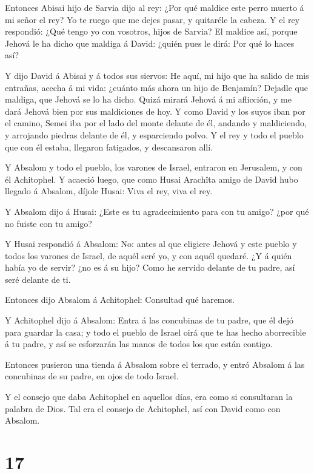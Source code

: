  Entonces Abisai hijo de Sarvia dijo al rey: ¿Por qué
maldice este perro muerto á mi señor el rey? Yo te ruego que me dejes
pasar, y quitaréle la cabeza.  Y el rey respondió: ¿Qué
tengo yo con vosotros, hijos de Sarvia? El maldice así, porque Jehová le
ha dicho que maldiga á David: ¿quién pues le dirá: Por qué lo haces así?

 Y dijo David á Abisai y á todos sus siervos: He aquí, mi
hijo que ha salido de mis entrañas, acecha á mi vida: ¿cuánto más ahora
un hijo de Benjamín? Dejadle que maldiga, que Jehová se lo ha dicho.
 Quizá mirará Jehová á mi aflicción, y me dará Jehová bien
por sus maldiciones de hoy.  Y como David y los suyos iban
por el camino, Semei iba por el lado del monte delante de él, andando y
maldiciendo, y arrojando piedras delante de él, y esparciendo polvo.
 Y el rey y todo el pueblo que con él estaba, llegaron
fatigados, y descansaron allí.

 Y Absalom y todo el pueblo, los varones de Israel,
entraron en Jerusalem, y con él Achitophel.  Y acaeció
luego, que como Husai Arachîta amigo de David hubo llegado á Absalom,
díjole Husai: Viva el rey, viva el rey.

 Y Absalom dijo á Husai: ¿Este es tu agradecimiento para
con tu amigo? ¿por qué no fuiste con tu amigo?

 Y Husai respondió á Absalom: No: antes al que eligiere
Jehová y este pueblo y todos los varones de Israel, de aquél seré yo, y
con aquél quedaré.  ¿Y á quién había yo de servir? ¿no es á
su hijo? Como he servido delante de tu padre, así seré delante de ti.

 Entonces dijo Absalom á Achitophel: Consultad qué haremos.

 Y Achitophel dijo á Absalom: Entra á las concubinas de tu
padre, que él dejó para guardar la casa; y todo el pueblo de Israel oirá
que te has hecho aborrecible á tu padre, y así se esforzarán las manos
de todos los que están contigo.

 Entonces pusieron una tienda á Absalom sobre el terrado, y
entró Absalom á las concubinas de su padre, en ojos de todo Israel.

 Y el consejo que daba Achitophel en aquellos días, era
como si consultaran la palabra de Dios. Tal era el consejo de
Achitophel, así con David como con Absalom.

\hypertarget{section-16}{%
\section{17}\label{section-16}}

